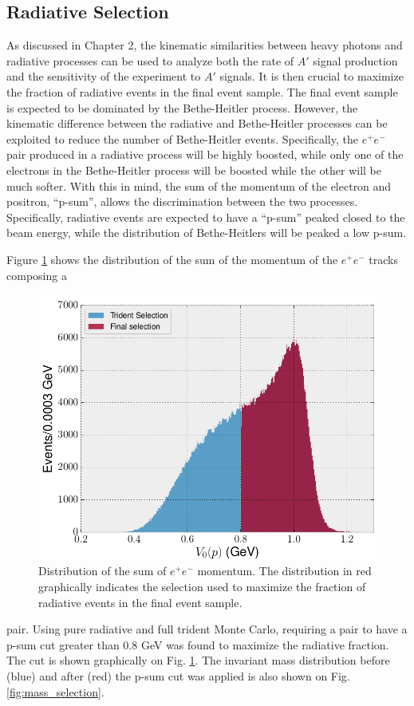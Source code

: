 \subsection{Radiative Selection}

As discussed in Chapter 2, the kinematic similarities between heavy photons and
radiative processes can be used to analyze both the rate of $A'$ signal production
and the sensitivity of the experiment to $A'$ signals.  It is then crucial to
maximize the fraction of radiative events in the final event sample.  The final
event sample is expected to be dominated by the Bethe-Heitler process.  However,
the kinematic difference between the radiative and Bethe-Heitler processes can 
be exploited to reduce the number of Bethe-Heitler events.  Specifically, the 
$e^+e^-$ pair produced in a radiative process will be highly boosted, while 
only one of the electrons in the Bethe-Heitler process will be boosted 
while the other will be much softer.  With this in mind, the sum of the momentum
of the electron and positron, ``p-sum'', allows the discrimination between the two processes.
Specifically, radiative events are expected to have a ``p-sum'' peaked 
closed to the beam energy, while the distribution of Bethe-Heitlers will be peaked a 
low p-sum.

Figure \ref{fig:p_sum} shows the distribution of the sum of the momentum of the $e^+e^-$ tracks composing a 
\begin{figure}[t]
    \centering
    \includegraphics[width=.7\textwidth]{images/20160504_psum.png}
    \caption{Distribution of the sum of $e^+e^-$ momentum.  The distribution in 
             red graphically indicates the selection used to maximize the fraction
             of  radiative events in the final event sample.}
    \label{fig:p_sum}
\end{figure}  
pair. Using pure radiative and full trident Monte Carlo, requiring a pair to have a 
p-sum cut greater than 0.8 GeV was found to maximize the radiative fraction.
The cut is shown graphically on Fig. \ref{fig:p_sum}.  The invariant mass
distribution before (blue) and after (red) the p-sum cut was applied is also shown
on Fig. \ref{fig:mass_selection}.

